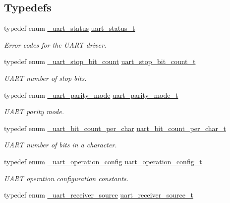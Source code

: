 \subsection*{Typedefs}
\begin{DoxyCompactItemize}
\item 
typedef enum \hyperlink{group__uart__hal_gacef40dc8e8ac174bfe40ebcbc980f84b}{\+\_\+uart\+\_\+status} \hyperlink{group__uart__hal_ga90effa380d181d660c1bb449977e1535}{uart\+\_\+status\+\_\+t}\hypertarget{group__uart__hal_ga90effa380d181d660c1bb449977e1535}{}\label{group__uart__hal_ga90effa380d181d660c1bb449977e1535}

\begin{DoxyCompactList}\small\item\em Error codes for the U\+A\+RT driver. \end{DoxyCompactList}\item 
typedef enum \hyperlink{group__uart__hal_ga3c656a4365cab1185398ff953272091e}{\+\_\+uart\+\_\+stop\+\_\+bit\+\_\+count} \hyperlink{group__uart__hal_ga1df1fcb3fcd2d2db0b7ea0189fd94554}{uart\+\_\+stop\+\_\+bit\+\_\+count\+\_\+t}
\begin{DoxyCompactList}\small\item\em U\+A\+RT number of stop bits. \end{DoxyCompactList}\item 
typedef enum \hyperlink{group__uart__hal_gadf9f66755acc340eab030e1a48e35e10}{\+\_\+uart\+\_\+parity\+\_\+mode} \hyperlink{group__uart__hal_ga3d74bf70252b21a0dd19d61587ed320c}{uart\+\_\+parity\+\_\+mode\+\_\+t}
\begin{DoxyCompactList}\small\item\em U\+A\+RT parity mode. \end{DoxyCompactList}\item 
typedef enum \hyperlink{group__uart__hal_ga09ceaf514baf3352c6c4a78155cbfd9d}{\+\_\+uart\+\_\+bit\+\_\+count\+\_\+per\+\_\+char} \hyperlink{group__uart__hal_gac4809775c7544386cbc25fcd06f695a2}{uart\+\_\+bit\+\_\+count\+\_\+per\+\_\+char\+\_\+t}
\begin{DoxyCompactList}\small\item\em U\+A\+RT number of bits in a character. \end{DoxyCompactList}\item 
typedef enum \hyperlink{group__uart__hal_ga6691a4a7f6d91eab489a02a8d8acbec9}{\+\_\+uart\+\_\+operation\+\_\+config} \hyperlink{group__uart__hal_ga82fb646c93dcafcd9a096c816ae3d376}{uart\+\_\+operation\+\_\+config\+\_\+t}
\begin{DoxyCompactList}\small\item\em U\+A\+RT operation configuration constants. \end{DoxyCompactList}\item 
typedef enum \hyperlink{group__uart__hal_gae84554e8367780b93162f4c3a3c46082}{\+\_\+uart\+\_\+receiver\+\_\+source} \hyperlink{group__uart__hal_ga39d3d0a8736e6a806cb474a4f9f13876}{uart\+\_\+receiver\+\_\+source\+\_\+t}\hypertarget{group__uart__hal_ga39d3d0a8736e6a806cb474a4f9f13876}{}\label{group__uart__hal_ga39d3d0a8736e6a806cb474a4f9f13876}


\end{DoxyCompactItemize}

